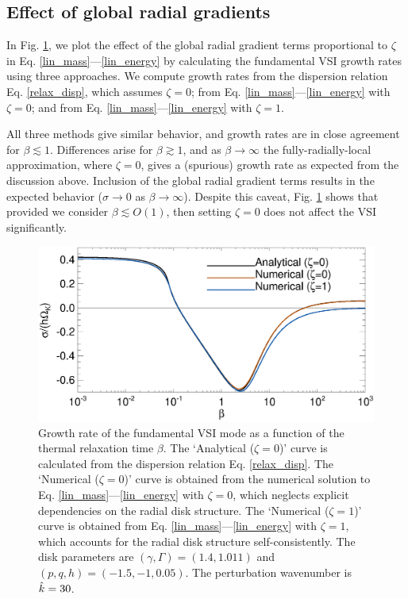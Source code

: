 \subsection{Effect of global radial gradients}
In  Fig. \ref{gcorr_compare}, we plot the effect of the global radial gradient terms
proportional to $\zeta$ in Eq. \ref{lin_mass}---\ref{lin_energy}
by calculating the
fundamental VSI growth rates using three approaches. We compute growth rates from the dispersion
relation Eq. \ref{relax_disp}, which assumes $\zeta=0$;  from
Eq. \ref{lin_mass}---\ref{lin_energy} with $\zeta=0$; and from
Eq. \ref{lin_mass}---\ref{lin_energy}  with $\zeta=1$.   

All three methods give similar behavior, and growth rates are in close
agreement for $\beta\lesssim 1$. Differences arise for 
$\beta\gtrsim1$, and as $\beta\to\infty$ the fully-radially-local
approximation, where $\zeta=0$, gives a
(spurious) growth rate as expected from the discussion
above. Inclusion of the global radial gradient terms results in the
expected behavior  ($\sigma\to0$ as $\beta\to\infty$). Despite this
caveat, Fig. \ref{gcorr_compare} shows that provided we consider 
$\beta\lesssim O(1)$, then setting $\zeta=0$ does not affect the VSI
significantly.  
  
\begin{figure}
  \includegraphics[width=\linewidth,clip=true,trim=0cm 0.0cm 0cm
  0cm]{figures/gcorr_compare} 
  \caption{Growth rate of the fundamental VSI mode as a function of
    the thermal relaxation time $\beta$. The `Analytical ($\zeta=0$)' curve
    is calculated from the dispersion relation Eq. \ref{relax_disp}. 
    The `Numerical ($\zeta=0$)' curve is obtained from the numerical
    solution to Eq. \ref{lin_mass}---\ref{lin_energy} with
    $\zeta=0$,  which 
    neglects explicit dependencies on the radial disk structure.  
    The `Numerical
    ($\zeta=1$)' curve is obtained from Eq. \ref{lin_mass}---\ref{lin_energy} with
    $\zeta=1$, which accounts for the radial disk structure self-consistently.   
    The disk parameters are $(\gamma, \Gamma)=(1.4, 1.011)$ and
    $(p,q,h)=(-1.5,-1,0.05)$. The perturbation 
    wavenumber is $\hat{k}=30$. 
    \label{gcorr_compare}}  
\end{figure}










